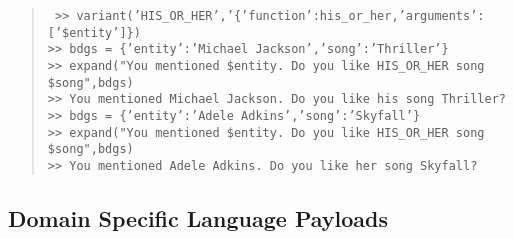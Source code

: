 \documentclass[letterpaper,11pt]{article}
\begin{document}
\begin{quotation} \tt
%
  \noindent
  >> variant('HIS\_OR\_HER','\{'function':his\_or\_her,'arguments':['\$entity']\})\\
  >> bdgs = \{'entity':'Michael Jackson','song':'Thriller'\}\\
  >> expand("You mentioned \$entity. Do you like HIS\_OR\_HER song \$song",bdgs)\\
  >> You mentioned Michael Jackson. Do you like his song Thriller?\\
  >> bdgs = \{'entity':'Adele Adkins','song':'Skyfall'\}\\
  >> expand("You mentioned \$entity. Do you like HIS\_OR\_HER song \$song",bdgs)\\
  >> You mentioned Adele Adkins. Do you like her song Skyfall?\\
%
\end{quotation}

\subsection*{Domain Specific Language Payloads}
\end{document}
